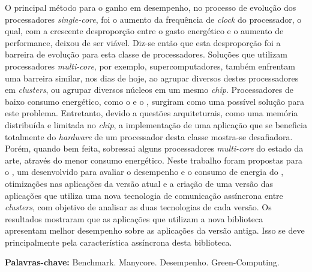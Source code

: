 \begin{resumo}[Resumo]
  O principal método para o ganho em desempenho, no processo de evolução dos processadores \textit{single-core}, foi o aumento da frequência de \textit{clock} do processador, o qual, com a crescente desproporção entre o gasto energético e o aumento de performance, deixou de ser viável. Diz-se então que esta desproporção foi a barreira de evolução para esta classe de processadores. Soluções que utilizam processadores \textit{multi-core}, por exemplo, supercomputadores, também enfrentam uma barreira similar, nos dias de hoje, ao agrupar diversos destes processadores em \textit{clusters}, ou agrupar diversos núcleos em um mesmo \textit{chip}. Processadores \manycore de baixo consumo energético, como o \mppa e o \epiphany, surgiram como uma possível solução para este problema. Entretanto, devido a questões arquiteturais, como uma memória distribuída e limitada no \textit{chip}, a implementação de uma aplicação que se beneficia totalmente do \textit{hardware} de um processador desta classe mostra-se desafiadora. Porém, quando bem feita, sobressai alguns processadores \textit{multi-core} do estado da arte, através do menor consumo energético. Neste trabalho foram propostas para o \capb, um \bench desenvolvido para avaliar o desempenho e o consumo de energia do \mppa, otimizações nas aplicações da versão atual e a criação de uma versão das aplicações que utiliza uma nova tecnologia de comunicação assíncrona entre \textit{clusters}, com objetivo de analisar as duas tecnologias de cada versão. Os resultados mostraram que as aplicações que utilizam a nova biblioteca apresentam melhor desempenho sobre as aplicações da versão antiga. Isso se deve principalmente pela característica assíncrona desta biblioteca.



  \vspace{\baselineskip} 
  \textbf{Palavras-chave:} Benchmark. Manycore. Desempenho. Green-Computing.
\end{resumo}


